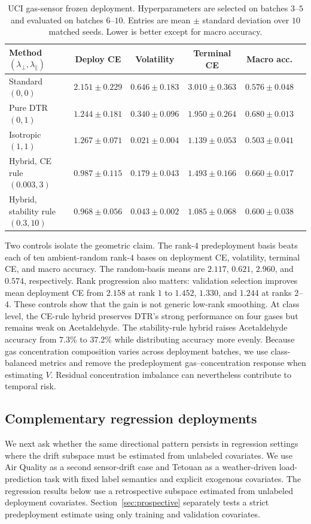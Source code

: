 \documentclass[conference]{IEEEtran}
\begin{document}
\begin{table}[t]
\caption{UCI gas-sensor frozen deployment. Hyperparameters are selected on batches $3$--$5$ and evaluated on batches $6$--$10$. Entries are mean $\pm$ standard deviation over $10$ matched seeds. Lower is better except for macro accuracy.}
\centering
\setlength{\tabcolsep}{5pt}
\footnotesize
\begin{tabular}{lccccc}
\toprule
Method $(\lambda_\perp,\lambda_\parallel)$ & Deploy CE & Volatility & Terminal CE & Macro acc. \\
\midrule
Standard $(0,0)$ & $2.151\pm0.229$ & $0.646\pm0.183$ & $3.010\pm0.363$ & $0.576\pm0.048$ \\
Pure DTR $(0,1)$ & $1.244\pm0.181$ & $0.340\pm0.096$ & $1.950\pm0.264$ & $\mathbf{0.680}\pm0.013$ \\
Isotropic $(1,1)$ & $1.267\pm0.071$ & $\mathbf{0.021}\pm0.004$ & $1.139\pm0.053$ & $0.503\pm0.041$ \\
Hybrid, CE rule $(0.003,3)$ & $0.987\pm0.115$ & $0.179\pm0.043$ & $1.493\pm0.166$ & $0.660\pm0.017$ \\
Hybrid, stability rule $(0.3,10)$ & $\mathbf{0.968}\pm0.056$ & $0.043\pm0.002$ & $\mathbf{1.085}\pm0.068$ & $0.600\pm0.038$ \\
\bottomrule
\end{tabular}
\label{tab:gas-hybrid}
\end{table}

Two controls isolate the geometric claim. The rank-$4$ predeployment basis beats each of ten ambient-random rank-$4$ bases on deployment CE, volatility, terminal CE, and macro accuracy. The random-basis means are $2.117$, $0.621$, $2.960$, and $0.574$, respectively. Rank progression also matters: validation selection improves mean deployment CE from $2.158$ at rank $1$ to $1.452$, $1.330$, and $1.244$ at ranks $2$--$4$. These controls show that the gain is not generic low-rank smoothing. At class level, the CE-rule hybrid preserves DTR's strong performance on four gases but remains weak on Acetaldehyde. The stability-rule hybrid raises Acetaldehyde accuracy from $7.3\%$ to $37.2\%$ while distributing accuracy more evenly. Because gas concentration composition varies across deployment batches, we use class-balanced metrics and remove the predeployment gas--concentration response when estimating $V$. Residual concentration imbalance can nevertheless contribute to temporal risk.

\subsection{Complementary regression deployments}
We next ask whether the same directional pattern persists in regression settings where the drift subspace must be estimated from unlabeled covariates. We use Air Quality as a second sensor-drift case and Tetouan as a weather-driven load-prediction task with fixed label semantics and explicit exogenous covariates.
The regression results below use a retrospective subspace estimated from unlabeled deployment covariates. Section~\ref{sec:prospective} separately tests a strict predeployment estimate using only training and validation covariates.
\end{document}

